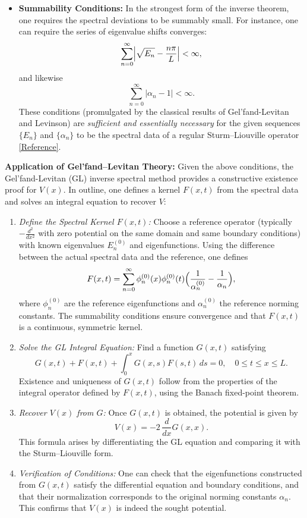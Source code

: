 \documentclass[12pt]{article}
\begin{document}
\begin{itemize}[leftmargin=*, labelsep=5mm]
    \item \textbf{Summability Conditions:} In the strongest form of the inverse theorem, one requires the spectral deviations to be summably small. For instance, one can require the series of eigenvalue shifts converges:
    \[
    \sum_{n=0}^\infty \Bigl| \sqrt{E_n} - \frac{n\pi}{L}\Bigr| < \infty,
    \]
    and likewise
    \[
    \sum_{n=0}^\infty |\alpha_n - 1| < \infty.
    \]
    These conditions (promulgated by the classical results of Gel’fand-Levitan and Levinson) are \emph{sufficient and essentially necessary} for the given sequences \(\{E_n\}\) and \(\{\alpha_n\}\) to be the spectral data of a regular Sturm–Liouville operator \href{http://www.kurims.kyoto-u.ac.jp/EMIS/journals/EJDE/Volumes/2015/27/ashrafyan.pdf#:~:text=Theorem%203.1%20%28,%C2%B5n%7D%E2%88%9E}{[Reference]}.
\end{itemize}

\textbf{Application of Gel’fand–Levitan Theory:} Given the above conditions, the Gel’fand-Levitan (GL) inverse spectral method provides a constructive existence proof for \(V(x)\). In outline, one defines a kernel \(F(x,t)\) from the spectral data and solves an integral equation to recover \(V\):

\begin{enumerate}[label=\arabic*.]
    \item \emph{Define the Spectral Kernel \(F(x,t)\):} Choose a reference operator (typically \(-\frac{d^2}{dx^2}\) with zero potential on the same domain and same boundary conditions) with known eigenvalues \(E_n^{(0)}\) and eigenfunctions. Using the difference between the actual spectral data and the reference, one defines  
    \[
    F(x,t) = \sum_{n=0}^\infty \phi_n^{(0)}(x)\phi_n^{(0)}(t)\Bigl(\frac{1}{\alpha_n^{(0)}} - \frac{1}{\alpha_n}\Bigr),
    \]
    where \(\phi_n^{(0)}\) are the reference eigenfunctions and \(\alpha_n^{(0)}\) the reference norming constants. The summability conditions ensure convergence and that \(F(x,t)\) is a continuous, symmetric kernel.
    
    \item \emph{Solve the GL Integral Equation:} Find a function \(G(x,t)\) satisfying 
    \[
    G(x,t) + F(x,t) + \int_0^x G(x,s)F(s,t)\,ds = 0,\quad 0\le t \le x \le L.
    \]
    Existence and uniqueness of \(G(x,t)\) follow from the properties of the integral operator defined by \(F(x,t)\), using the Banach fixed-point theorem.
    
    \item \emph{Recover \(V(x)\) from \(G\):} Once \(G(x,t)\) is obtained, the potential is given by 
    \[
    V(x) = -2\,\frac{d}{dx}G(x,x).
    \]
    This formula arises by differentiating the GL equation and comparing it with the Sturm–Liouville form.
    
    \item \emph{Verification of Conditions:} One can check that the eigenfunctions constructed from \(G(x,t)\) satisfy the differential equation and boundary conditions, and that their normalization corresponds to the original norming constants \(\alpha_n\). This confirms that \(V(x)\) is indeed the sought potential.
\end{enumerate}
\end{document}
